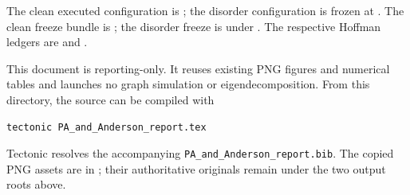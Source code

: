 \documentclass[11pt]{article}
\newcommand{\code}[1]{\texttt{#1}}
\begin{document}
The clean executed configuration is
; the disorder configuration is frozen at
.
The clean freeze bundle is
;
the disorder freeze is under
.
The respective Hoffman ledgers are
and
.

This document is reporting-only.  It reuses existing PNG figures and numerical tables and launches no graph simulation or eigendecomposition.  From this directory, the source can be compiled with
\begin{verbatim}
tectonic PA_and_Anderson_report.tex
\end{verbatim}
Tectonic resolves the accompanying \code{PA\_and\_Anderson\_report.bib}.  The copied PNG assets are in ; their authoritative originals remain under the two output roots above.

\clearpage


\end{document}
